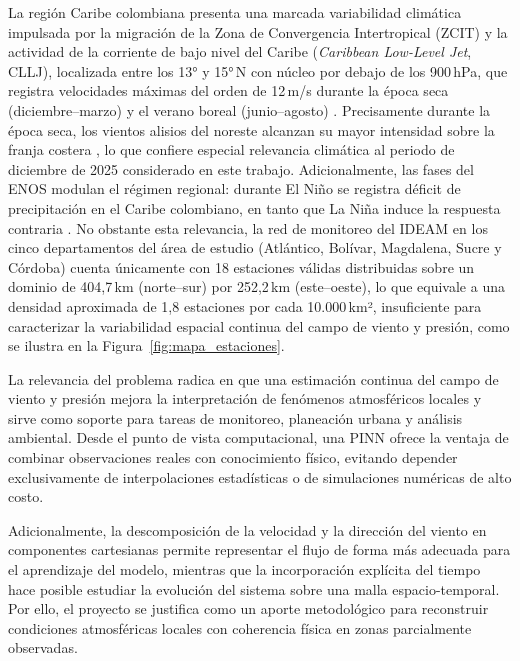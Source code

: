 La región Caribe colombiana presenta una marcada variabilidad climática impulsada por la migración de la Zona de Convergencia Intertropical (ZCIT) y la actividad de la corriente de bajo nivel del Caribe (\textit{Caribbean Low-Level Jet}, CLLJ), localizada entre los 13° y 15°\,N con núcleo por debajo de los 900\,hPa, que registra velocidades máximas del orden de 12\,m/s durante la época seca (diciembre--marzo) y el verano boreal (junio--agosto) \citep{perez2018seabreeze}. Precisamente durante la época seca, los vientos alisios del noreste alcanzan su mayor intensidad sobre la franja costera \citep{ideam2005atlas}, lo que confiere especial relevancia climática al periodo de diciembre de 2025 considerado en este trabajo. Adicionalmente, las fases del ENOS modulan el régimen regional: durante El Niño se registra déficit de precipitación en el Caribe colombiano, en tanto que La Niña induce la respuesta contraria \citep{pabon2017fenomenos}. No obstante esta relevancia, la red de monitoreo del IDEAM en los cinco departamentos del área de estudio (Atlántico, Bolívar, Magdalena, Sucre y Córdoba) cuenta únicamente con 18 estaciones válidas distribuidas sobre un dominio de 404,7\,km (norte--sur) por 252,2\,km (este--oeste), lo que equivale a una densidad aproximada de 1,8 estaciones por cada 10.000\,km², insuficiente para caracterizar la variabilidad espacial continua del campo de viento y presión, como se ilustra en la Figura~\ref{fig:mapa_estaciones}.

La relevancia del problema radica en que una estimación continua del campo de viento y presión mejora la interpretación de fenómenos atmosféricos locales y sirve como soporte para tareas de monitoreo, planeación urbana y análisis ambiental. Desde el punto de vista computacional, una PINN ofrece la ventaja de combinar observaciones reales con conocimiento físico, evitando depender exclusivamente de interpolaciones estadísticas o de simulaciones numéricas de alto costo.

Adicionalmente, la descomposición de la velocidad y la dirección del viento en componentes cartesianas permite representar el flujo de forma más adecuada para el aprendizaje del modelo, mientras que la incorporación explícita del tiempo hace posible estudiar la evolución del sistema sobre una malla espacio-temporal. Por ello, el proyecto se justifica como un aporte metodológico para reconstruir condiciones atmosféricas locales con coherencia física en zonas parcialmente observadas.


